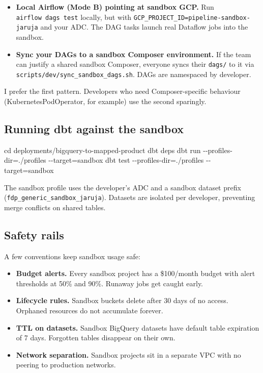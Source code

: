 \documentclass[
  11pt,
  british,
  oneside]{book}
\newenvironment{Shaded}{\begin{snugshade}}{\end{snugshade}}
\newcommand{\BuiltInTok}[1]{#1}
\newcommand{\ExtensionTok}[1]{#1}
\newcommand{\NormalTok}[1]{#1}
\providecommand{\tightlist}{%
  \setlength{\itemsep}{0pt}\setlength{\parskip}{0pt}}
\begin{document}
\begin{itemize}
\tightlist
\item
  \textbf{Local Airflow (Mode B) pointing at sandbox GCP.} Run
  \texttt{airflow\ dags\ test} locally, but with
  \texttt{GCP\_PROJECT\_ID=pipeline-sandbox-jaruja} and your ADC. The
  DAG tasks launch real Dataflow jobs into the sandbox.
\item
  \textbf{Sync your DAGs to a sandbox Composer environment.} If the team
  can justify a shared sandbox Composer, everyone syncs their
  \texttt{dags/} to it via \texttt{scripts/dev/sync\_sandbox\_dags.sh}.
  DAGs are namespaced by developer.
\end{itemize}

I prefer the first pattern. Developers who need Composer-specific
behaviour (KubernetesPodOperator, for example) use the second sparingly.

\hypertarget{running-dbt-against-the-sandbox}{%
\subsection{Running dbt against the
sandbox}\label{running-dbt-against-the-sandbox}}

\begin{Shaded}
\begin{Highlighting}[]
\BuiltInTok{cd}\NormalTok{ deployments/bigquery{-}to{-}mapped{-}product}
\ExtensionTok{dbt}\NormalTok{ deps}
\ExtensionTok{dbt}\NormalTok{ run {-}{-}profiles{-}dir=./profiles {-}{-}target=sandbox}
\ExtensionTok{dbt}\NormalTok{ test {-}{-}profiles{-}dir=./profiles {-}{-}target=sandbox}
\end{Highlighting}
\end{Shaded}

The sandbox profile uses the developer's ADC and a sandbox dataset
prefix (\texttt{fdp\_generic\_sandbox\_jaruja}). Datasets are isolated
per developer, preventing merge conflicts on shared tables.

\hypertarget{safety-rails}{%
\subsection{Safety rails}\label{safety-rails}}

A few conventions keep sandbox usage safe:

\begin{itemize}
\tightlist
\item
  \textbf{Budget alerts.} Every sandbox project has a \$100/month budget
  with alert thresholds at 50\% and 90\%. Runaway jobs get caught early.
\item
  \textbf{Lifecycle rules.} Sandbox buckets delete after 30 days of no
  access. Orphaned resources do not accumulate forever.
\item
  \textbf{TTL on datasets.} Sandbox BigQuery datasets have default table
  expiration of 7 days. Forgotten tables disappear on their own.
\item
  \textbf{Network separation.} Sandbox projects sit in a separate VPC
  with no peering to production networks.
\end{itemize}
\end{document}
